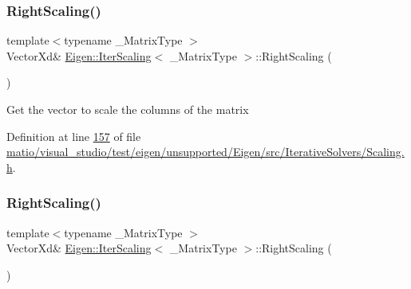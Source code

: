 \mbox{\label{class_eigen_1_1_iter_scaling_a617229454935a6a4fda76b8af56c52ea}} 
\subsubsection{\texorpdfstring{Right\+Scaling()}{RightScaling()}\hspace{0.1cm}{\footnotesize\ttfamily [1/2]}}
{\footnotesize\ttfamily template$<$typename \+\_\+\+Matrix\+Type $>$ \\
Vector\+Xd\& \hyperlink{class_eigen_1_1_iter_scaling}{Eigen\+::\+Iter\+Scaling}$<$ \+\_\+\+Matrix\+Type $>$\+::Right\+Scaling (\begin{DoxyParamCaption}{ }\end{DoxyParamCaption})\hspace{0.3cm}{\ttfamily [inline]}}

Get the vector to scale the columns of the matrix 

Definition at line \hyperlink{matio_2visual__studio_2test_2eigen_2unsupported_2_eigen_2src_2_iterative_solvers_2_scaling_8h_source_l00157}{157} of file \hyperlink{matio_2visual__studio_2test_2eigen_2unsupported_2_eigen_2src_2_iterative_solvers_2_scaling_8h_source}{matio/visual\+\_\+studio/test/eigen/unsupported/\+Eigen/src/\+Iterative\+Solvers/\+Scaling.\+h}.

\mbox{\label{class_eigen_1_1_iter_scaling_a617229454935a6a4fda76b8af56c52ea}} 
\subsubsection{\texorpdfstring{Right\+Scaling()}{RightScaling()}\hspace{0.1cm}{\footnotesize\ttfamily [2/2]}}
{\footnotesize\ttfamily template$<$typename \+\_\+\+Matrix\+Type $>$ \\
Vector\+Xd\& \hyperlink{class_eigen_1_1_iter_scaling}{Eigen\+::\+Iter\+Scaling}$<$ \+\_\+\+Matrix\+Type $>$\+::Right\+Scaling (\begin{DoxyParamCaption}{ }\end{DoxyParamCaption})\hspace{0.3cm}{\ttfamily [inline]}}

